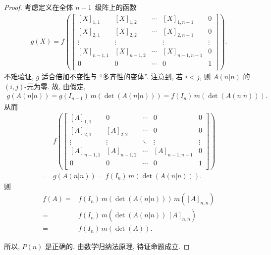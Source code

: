 \begin{proof}
    考虑定义在全体 \(n-1\)~级阵上的函数
    \begin{align*}
        g(X)
        =
        f\left(
        \begin{bmatrix}
            [X]_{1,1}   & [X]_{1,2}   & \cdots & [X]_{1,n-1}   & 0      \\
            [X]_{2,1}   & [X]_{2,2}   & \cdots & [X]_{2,n-1}   & 0      \\
            \vdots      & \vdots      & {}     & \vdots        & \vdots \\
            [X]_{n-1,1} & [X]_{n-1,2} & \cdots & [X]_{n-1,n-1} & 0      \\
            0           & 0           & \cdots & 0             & 1      \\
        \end{bmatrix}
        \right).
    \end{align*}
    不难验证, \(g\) 适合倍加不变性与 ``多齐性的变体''.
    注意到, 若 \(i < j\),
    则 \(A(n|n)\) 的 \((i, j)\)-元为零.
    故, 由假定,
    \begin{align*}
        g(A(n|n)) = g(I_{n-1})\, m(\det {(A(n|n))})
        = f(I_n)\, m(\det {(A(n|n))}).
    \end{align*}
    从而
    \begin{align*}
             &
        f\left(
        \begin{bmatrix}
                [A]_{1,1}   & 0           & \cdots & 0             & 0      \\
                [A]_{2,1}   & [A]_{2,2}   & \cdots & 0             & 0      \\
                \vdots      & \vdots      & \ddots & \vdots        & \vdots \\
                [A]_{n-1,1} & [A]_{n-1,2} & \cdots & [A]_{n-1,n-1} & 0      \\
                0           & 0           & \cdots & 0             & 1      \\
            \end{bmatrix}
        \right)
        \\
        = {} &
        g(A(n|n)) = f(I_n)\, m(\det {(A(n|n))}).
    \end{align*}
    则
    \begin{align*}
        f(A)
        = {} & f(I_n)\, m(\det {(A(n|n))}) \,m([A]_{n,n}) \\
        = {} & f(I_n)\, m(\det {(A(n|n))} \,[A]_{n,n})    \\
        = {} & f(I_n)\, m(\det {(A)}).
    \end{align*}

    所以, \(P(n)\) 是正确的.
    由数学归纳法原理, 待证命题成立.
\end{proof}

